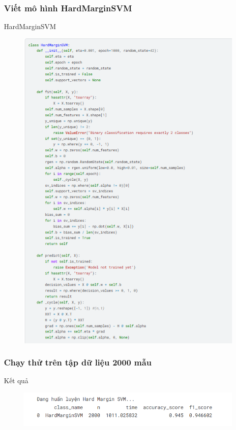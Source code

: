 \documentclass[serif, aspectratio=169]{beamer}
\begin{document}
	\subsubsection{Viết mô hình HardMarginSVM}
	\begin{frame}{HardMarginSVM}
		\begin{figure}
			\centering
			\includegraphics[width=0.5\linewidth]{pic/hard-margin-svm.png}
			\label{fig:hard-margin-svm}
		\end{figure}
	\end{frame}
	\subsubsection{Chạy thử trên tập dữ liệu 2000 mẫu}
	\begin{frame}{Kết quả}
		\begin{figure}
			\centering
			\includegraphics[width=1\linewidth]{pic/hardmargin-svm-result2000.png}
			\label{fig:hardmargin-svm-result2000}
		\end{figure}
	\end{frame}
	
\end{document}
